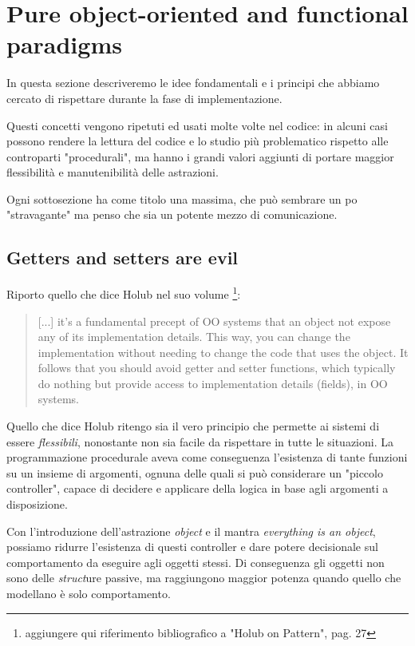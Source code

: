 \section{Pure object-oriented and functional paradigms}
\label{sec:objects-oriented-functional-paradigms}

In questa sezione descriveremo le idee fondamentali e i principi che
abbiamo cercato di rispettare durante la fase di implementazione.

Questi concetti vengono ripetuti ed usati molte volte nel codice: in
alcuni casi possono rendere la lettura del codice e lo studio pi\`u
problematico rispetto alle controparti "procedurali", ma hanno i
grandi valori aggiunti di portare maggior flessibilit\`a e
manutenibilit\`a delle astrazioni.

Ogni sottosezione ha come titolo una massima, che pu\`o sembrare un po
"stravagante" ma penso che sia un potente mezzo di comunicazione.

\subsection{Getters and setters are evil}
Riporto quello che dice Holub nel suo volume \footnote{aggiungere qui
  riferimento bibliografico a "Holub on Pattern", pag. 27}:
\begin{quotation}
  [...] it's a fundamental precept of OO systems that an object not
  expose any of its implementation details. This way, you can change
  the implementation without needing to change the code that uses the
  object. It follows that you should avoid getter and setter
  functions, which typically do nothing but provide access to
  implementation details (fields), in OO systems.
\end{quotation}

Quello che dice Holub ritengo sia il vero principio che permette ai
sistemi di essere \emph{flessibili}, nonostante non sia facile da
rispettare in tutte le situazioni. La programmazione procedurale aveva
come conseguenza l'esistenza di tante funzioni su un insieme di
argomenti, ognuna delle quali si pu\`o considerare un "piccolo
controller", capace di decidere e applicare della logica in base agli
argomenti a disposizione.

Con l'introduzione dell'astrazione \emph{object} e il mantra
\emph{everything is an object}, possiamo ridurre l'esistenza di questi
controller e dare potere decisionale sul comportamento da eseguire
agli oggetti stessi. Di conseguenza gli oggetti non sono delle
\emph{struct}ure passive, ma raggiungono maggior potenza quando quello
che modellano \`e solo comportamento.

